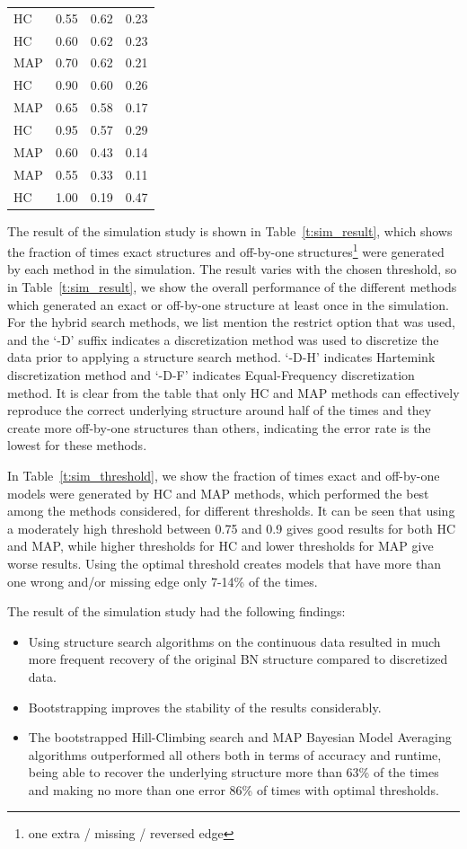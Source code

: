 \documentclass[smallcondensed]{svjour3}     %
\begin{document}
\begin{table}
{{\begin{tabular}{llll}
HC & 0.55 & 0.62 & 0.23 \\
HC & 0.60 & 0.62 & 0.23 \\
MAP & 0.70 & 0.62 & 0.21 \\
HC & 0.90 & 0.60 & 0.26 \\
MAP & 0.65 & 0.58 & 0.17 \\
HC & 0.95 & 0.57 & 0.29 \\
MAP & 0.60 & 0.43 & 0.14 \\
MAP & 0.55 & 0.33 & 0.11 \\
HC & 1.00 & 0.19 & 0.47\\ \hline
\end{tabular}
}}
\vspace{-10pt}
\end{table}

The result of the simulation study is shown in Table~\ref{t:sim_result}, which shows 
the fraction of times exact structures and off-by-one structures\footnote{one extra 
/ missing / reversed edge} were generated by each method in the simulation. The result varies 
with the chosen threshold, so in Table~\ref{t:sim_result}, we show the overall performance of the
different methods  which generated an exact or off-by-one structure at least once in the simulation.
For the hybrid search methods, we list mention the restrict option that was used, and the 
`-D' suffix indicates a discretization method was used to discretize the data prior to applying 
a structure search method. `-D-H' indicates Hartemink discretization method and `-D-F' indicates 
Equal-Frequency discretization method. It is clear from the table that only HC and MAP methods
can effectively reproduce the correct underlying structure around half of the times and they create 
more off-by-one structures than others, indicating the error rate is the lowest for these methods.


In Table~\ref{t:sim_threshold}, we show the fraction of times exact and 
off-by-one models were generated by HC and MAP methods, which performed 
the best among the methods considered,  for different thresholds. 
It can be seen that using a moderately high threshold between 0.75 and 0.9 gives
good results for both HC and MAP, while higher thresholds for HC and lower thresholds for MAP
give worse results. Using the optimal threshold creates models that have more than one wrong 
and/or missing edge only 7-14\% of the times. 

The result of the simulation study had the following findings:
\begin{itemize}
\item Using structure search algorithms on the continuous data resulted in much more frequent recovery of the original BN structure compared to discretized data.
\item Bootstrapping  improves the stability of the results considerably.
\item The bootstrapped Hill-Climbing search and MAP Bayesian Model Averaging algorithms outperformed all others both in terms of accuracy and runtime, being able to recover the underlying structure more than 63\% of the times and making no more than one error 86\% of times with optimal thresholds. 
\end{itemize}
\end{document}
